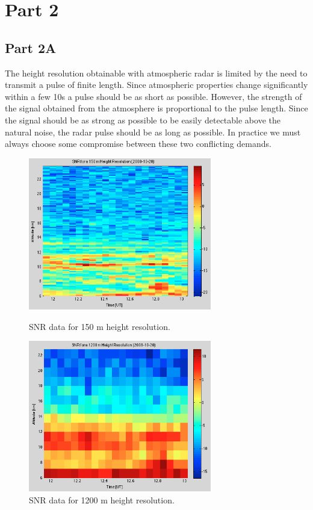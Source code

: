 \documentclass{article}
\begin{document}
\section{Part 2}


\subsection{Part 2A}

The height resolution obtainable with atmospheric radar is limited by the need to transmit a pulse of finite length. Since atmospheric properties change significantly within a few 10s a pulse should be as short as possible. However, the strength of the signal obtained from the atmosphere is proportional to the pulse length. Since the signal should be as strong as possible to be easily detectable above the natural noise, the radar pulse should be as long as possible. In practice we must always choose some compromise between these two conflicting demands. \cite{Enmark:2012a2}


\begin{figure}[htb]
\begin{minipage}[t]{0.5\linewidth}
\centering
\includegraphics[width=8cm]{Figures/height_res_150m.png}
\caption{SNR data for 150 m height resolution.}
\label{fig:height_res_150m}
\end{minipage}
\begin{minipage}[t]{0.5\linewidth}
\centering
\includegraphics[width=8cm]{Figures/height_res_1200m.png}
\caption{SNR data for 1200 m height resolution.}
\label{fig:height_res_1200m}
\end{minipage}
\end{figure}
\end{document}
